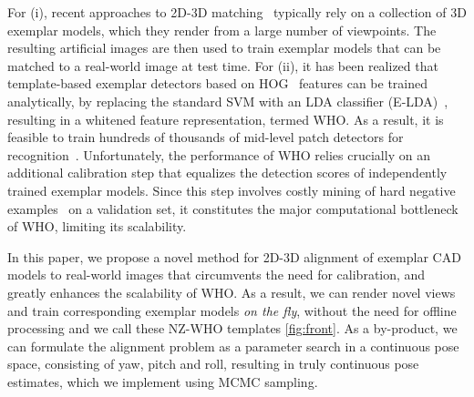 For (i), recent approaches to 2D-3D matching~\cite{Aubry14, Lim14}
typically rely on a
collection of 3D exemplar models, which they render from a
large number of viewpoints. The resulting artificial images are then
used to train exemplar models that can be matched to a real-world
image at test time.
%
For (ii), it has been realized that template-based exemplar detectors
based on HOG~\cite{Dalal05} features can be trained analytically, by
replacing the standard SVM with an LDA classifier
(E-LDA)~\cite{Hariharan12}, resulting in a whitened feature
representation, termed WHO. As a result, it is feasible to train
hundreds of thousands of mid-level patch detectors for
recognition~\cite{Aubry14}.
%
Unfortunately, the performance of WHO relies crucially on an
additional calibration step that equalizes the detection scores of
independently trained exemplar models. Since this step involves costly
mining of hard negative examples~\cite{Dalal05,Felzenszwalb10} on a
validation set, it constitutes the major computational bottleneck of
WHO, limiting its scalability.

In this paper, we propose a novel method for 2D-3D alignment of
exemplar CAD models to real-world images that circumvents the need for
calibration, and greatly enhances the scalability of WHO. As a
result, we can render novel views and train corresponding exemplar
models {\em on the fly}, without the need for offline processing and we call
these NZ-WHO templates \ref{fig:front}. As a
by-product, we can formulate the alignment problem as a parameter
search in a continuous pose space, consisting of yaw, pitch and roll, resulting
in truly continuous pose estimates, which
we implement using MCMC sampling.

%


